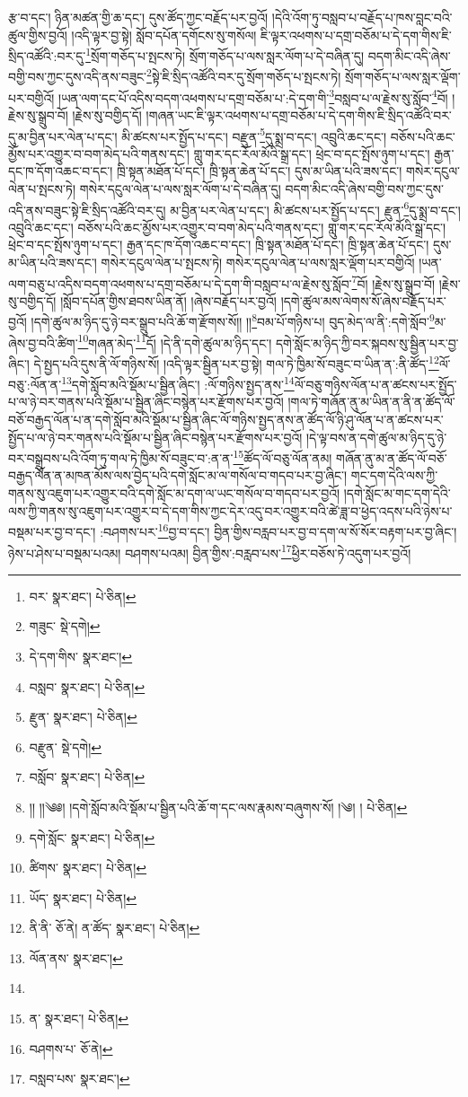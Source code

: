 རྩ་བ་དང་། ཉིན་མཚན་གྱི་ཆ་དང་། དུས་ཚོད་ཀྱང་བརྗོད་པར་བྱའོ། །དེའི་འོག་ཏུ་བསླབ་པ་བརྗོད་པ་ཁས་བླང་བའི་ཚུལ་གྱིས་བྱའོ། །འདི་ལྟར་བྱ་སྟེ། སློབ་དཔོན་དགོངས་སུ་གསོལ། ཇི་ལྟར་འཕགས་པ་དགྲ་བཅོམ་པ་དེ་དག་གིས་ཇི་སྲིད་འཚོའི་:བར་དུ་\footnote{བར་  སྣར་ཐང་།  པེ་ཅིན། }སྲོག་གཅོད་པ་སྤངས་ཏེ། སྲོག་གཅོད་པ་ལས་སླར་ལོག་པ་དེ་བཞིན་དུ། བདག་མིང་འདི་ཞེས་བགྱི་བས་ཀྱང་དུས་འདི་ནས་བཟུང་\footnote{གཟུང་  སྡེ་དགེ། }སྟེ་ཇི་སྲིད་འཚོའི་བར་དུ་སྲོག་གཅོད་པ་སྤངས་ཏེ། སྲོག་གཅོད་པ་ལས་སླར་ལྡོག་པར་བགྱིའོ། །ཡན་ལག་དང་པོ་འདིས་བདག་འཕགས་པ་དགྲ་བཅོམ་པ་:དེ་དག་གི་\footnote{དེ་དག་གིས་  སྣར་ཐང་། }བསླབ་པ་ལ་རྗེས་སུ་སློབ་\footnote{བསླབ་  སྣར་ཐང་།  པེ་ཅིན། }བོ། །རྗེས་སུ་སྒྲུབ་བོ། །རྗེས་སུ་བགྱིད་དོ། །གཞན་ཡང་ཇི་ལྟར་འཕགས་པ་དགྲ་བཅོམ་པ་དེ་དག་གིས་ཇི་སྲིད་འཚོའི་བར་དུ་མ་བྱིན་པར་ལེན་པ་དང་། མི་ཚངས་པར་སྤྱོད་པ་དང་། བརྫུན་\footnote{རྫུན་  སྣར་ཐང་།  པེ་ཅིན། }དུ་སྨྲ་བ་དང་། འབྲུའི་ཆང་དང་། བཅོས་པའི་ཆང་མྱོས་པར་འགྱུར་བ་བག་མེད་པའི་གནས་དང་། གླུ་གར་དང་རོལ་མོའི་སྒྲ་དང་། ཕྲེང་བ་དང་སྤོས་ཉུག་པ་དང་། རྒྱན་དང་ཁ་དོག་འཆང་བ་དང་། ཁྲི་སྟན་མཐོན་པོ་དང་། ཁྲི་སྟན་ཆེན་པོ་དང་། དུས་མ་ཡིན་པའི་ཟས་དང་། གསེར་དངུལ་ལེན་པ་སྤངས་ཏེ། གསེར་དངུལ་ལེན་པ་ལས་སླར་ལོག་པ་དེ་བཞིན་དུ། བདག་མིང་འདི་ཞེས་བགྱི་བས་ཀྱང་དུས་འདི་ནས་བཟུང་སྟེ་ཇི་སྲིད་འཚོའི་བར་དུ། མ་བྱིན་པར་ལེན་པ་དང་། མི་ཚངས་པར་སྤྱོད་པ་དང་། རྫུན་\footnote{བརྫུན་  སྡེ་དགེ། }དུ་སྨྲ་བ་དང་། འབྲུའི་ཆང་དང་། བཅོས་པའི་ཆང་མྱོས་པར་འགྱུར་བ་བག་མེད་པའི་གནས་དང་། གླུ་གར་དང་རོལ་མོའི་སྒྲ་དང་། ཕྲེང་བ་དང་སྤོས་ཉུག་པ་དང་། རྒྱན་དང་ཁ་དོག་འཆང་བ་དང་། ཁྲི་སྟན་མཐོན་པོ་དང་། ཁྲི་སྟན་ཆེན་པོ་དང་། དུས་མ་ཡིན་པའི་ཟས་དང་། གསེར་དངུལ་ལེན་པ་སྤངས་ཏེ། གསེར་དངུལ་ལེན་པ་ལས་སླར་ལྡོག་པར་བགྱིའོ། །ཡན་ལག་བཅུ་པ་འདིས་བདག་འཕགས་པ་དགྲ་བཅོམ་པ་དེ་དག་གི་བསླབ་པ་ལ་རྗེས་སུ་སློབ་\footnote{བསློབ་  སྣར་ཐང་།  པེ་ཅིན། }བོ། །རྗེས་སུ་སྒྲུབ་བོ། །རྗེས་སུ་བགྱིད་དོ། །སློབ་དཔོན་གྱིས་ཐབས་ཡིན་ནོ། །ཞེས་བརྗོད་པར་བྱའོ། །དགེ་ཚུལ་མས་ལེགས་སོ་ཞེས་བརྗོད་པར་བྱའོ། །དགེ་ཚུལ་མ་ཉིད་དུ་ཉེ་བར་སྒྲུབ་པའི་ཆོ་ག་རྫོགས་སོ།། །།\footnote{།། །།༄༅། །དགེ་སློབ་མའི་སྡོམ་པ་སྦྱིན་པའི་ཆོ་ག་དང་ལས་རྣམས་བཞུགས་སོ། །༄། །  པེ་ཅིན། }བམ་པོ་གཉིས་པ། བུད་མེད་ལ་ནི་:དགེ་སློབ་\footnote{དགེ་སློང་  སྣར་ཐང་།  པེ་ཅིན། }མ་ཞེས་བྱ་བའི་ཚིག་\footnote{ཚིགས་  སྣར་ཐང་།  པེ་ཅིན། }གཞན་མེད་\footnote{ཡོད་  སྣར་ཐང་།  པེ་ཅིན། }དོ། །དེ་ནི་དགེ་ཚུལ་མ་ཉིད་དང་། དགེ་སློང་མ་ཉིད་ཀྱི་བར་སྐབས་སུ་སྦྱིན་པར་བྱ་ཞིང་། དེ་སྤྱད་པའི་དུས་ནི་ལོ་གཉིས་སོ། །འདི་ལྟར་སྦྱིན་པར་བྱ་སྟེ། གལ་ཏེ་ཁྱིམ་སོ་བཟུང་བ་ཡིན་ན་:ནི་ཚོད་\footnote{ནི་ནི་  ཅོ་ནེ། ན་ཚོད་  སྣར་ཐང་།  པེ་ཅིན། }ལོ་བཅུ་:ལོན་ན་\footnote{ལོན་ནས་  སྣར་ཐང་། }དགེ་སློབ་མའི་སྡོམ་པ་སྦྱིན་ཞིང་། :ལོ་གཉིས་སྤྱད་ནས་\footnote{}ལོ་བཅུ་གཉིས་ལོན་པ་ན་ཚངས་པར་སྤྱོད་པ་ལ་ཉེ་བར་གནས་པའི་སྡོམ་པ་སྦྱིན་ཞིང་བསྙེན་པར་རྫོགས་པར་བྱའོ། །གལ་ཏེ་གཞོན་ནུ་མ་ཡིན་ན་ནི་ན་ཚོད་ལོ་བཅོ་བརྒྱད་ལོན་པ་ན་དགེ་སློབ་མའི་སྡོམ་པ་སྦྱིན་ཞིང་ལོ་གཉིས་སྤྱད་ནས་ན་ཚོད་ལོ་ཉི་ཤུ་ལོན་པ་ན་ཚངས་པར་སྤྱོད་པ་ལ་ཉེ་བར་གནས་པའི་སྡོམ་པ་སྦྱིན་ཞིང་བསྙེན་པར་རྫོགས་པར་བྱའོ། །དེ་ལྟ་བས་ན་དགེ་ཚུལ་མ་ཉིད་དུ་ཉེ་བར་བསྒྲུབས་པའི་འོག་ཏུ་གལ་ཏེ་ཁྱིམ་སོ་བཟུང་བ་:ན་ན་\footnote{ན་  སྣར་ཐང་།  པེ་ཅིན། }ཚོད་ལོ་བཅུ་ལོན་ནམ། གཞོན་ནུ་མ་ན་ཚོད་ལོ་བཅོ་བརྒྱད་ལོན་ན་མཁན་མོས་ལས་བྱེད་པའི་དགེ་སློང་མ་ལ་གསོལ་བ་གདབ་པར་བྱ་ཞིང་། གང་དག་དེའི་ལས་ཀྱི་གནས་སུ་འཇུག་པར་འགྱུར་བའི་དགེ་སློང་མ་དག་ལ་ཡང་གསོལ་བ་གདབ་པར་བྱའོ། །དགེ་སློང་མ་གང་དག་དེའི་ལས་ཀྱི་གནས་སུ་འཇུག་པར་འགྱུར་བ་དེ་དག་གིས་ཀྱང་དེར་འདུ་བར་འགྱུར་བའི་ཚེ་ཟླ་བ་ཕྱེད་འདས་པའི་ཉེས་པ་བསྡམ་པར་བྱ་བ་དང་། :བཤགས་པར་\footnote{བཤགས་པ་  ཅོ་ནེ། }བྱ་བ་དང་། བྱིན་གྱིས་བརླབ་པར་བྱ་བ་དག་ལ་སོ་སོར་བརྟག་པར་བྱ་ཞིང་། ཉེས་པ་ཤེས་པ་བསྡམ་པའམ། བཤགས་པའམ། བྱིན་གྱིས་:བརླབ་པས་\footnote{བསླབ་པས་  སྣར་ཐང་། }ཕྱིར་བཅོས་ཏེ་འདུག་པར་བྱའོ། 